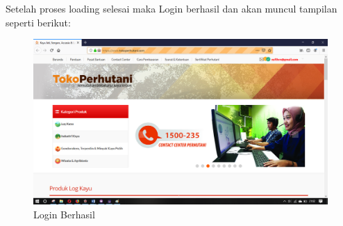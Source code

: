 Setelah proses loading selesai maka Login berhasil dan akan muncul tampilan seperti berikut:
\begin{figure}[h]
 	\centering
 	\includegraphics[scale=0.20]{figures/2login}
 	\caption{Login Berhasil}
\end{figure}










































































